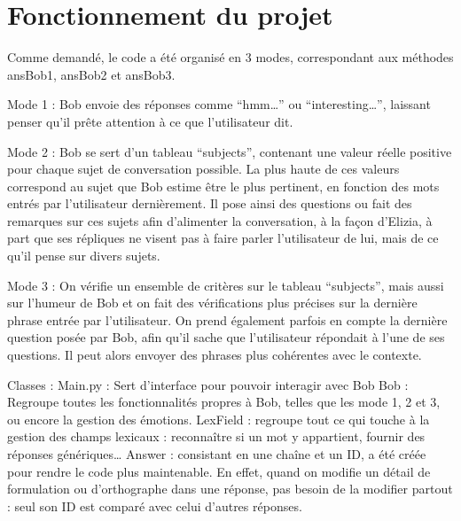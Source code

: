 \documentclass[paper=a4, 12pt]{report}
\begin{document}
\section{Fonctionnement du projet}
\vspace{0.5cm}
Comme demandé, le code a été organisé en 3 modes, correspondant aux méthodes ansBob1, ansBob2 et ansBob3.

\vspace{0.5cm}

Mode 1 : Bob  envoie des réponses comme “hmm…” ou “interesting…”, laissant penser qu’il prête attention à ce que l’utilisateur dit.

\vspace{0.5cm}

Mode 2 : Bob se sert d’un tableau “subjects”, contenant une valeur réelle positive pour chaque sujet de conversation possible. La plus haute de ces valeurs correspond au sujet que Bob estime être le plus pertinent, en fonction des mots entrés par l’utilisateur dernièrement. Il pose ainsi des questions ou fait des remarques sur ces sujets afin d’alimenter la conversation, à la façon d’Elizia, à part que ses répliques ne visent pas à faire parler l’utilisateur de lui, mais de ce qu’il pense sur divers sujets.

\vspace{0.5cm}

Mode 3 : On vérifie un ensemble de critères sur le tableau “subjects”, mais aussi sur l’humeur de Bob et on fait des vérifications plus précises sur la dernière phrase entrée par l’utilisateur. On prend également parfois en compte la dernière question posée par Bob, afin qu’il sache que l’utilisateur répondait à l’une de ses questions. Il peut alors envoyer des phrases plus cohérentes avec le contexte.

\vspace{0.5cm}

Classes :
Main.py : Sert d’interface pour pouvoir interagir avec Bob
Bob : Regroupe toutes les fonctionnalités propres à Bob, telles que les mode 1, 2 et 3, ou encore la gestion des émotions.
LexField : regroupe tout ce qui touche à la gestion des champs lexicaux : reconnaître si un mot y appartient, fournir des réponses génériques…
Answer : consistant en une chaîne et un ID, a été créée pour rendre le code plus maintenable. En effet, quand on modifie un détail de formulation ou d’orthographe dans une réponse, pas besoin de la modifier partout : seul son ID est comparé avec celui d’autres réponses.
\end{document}
